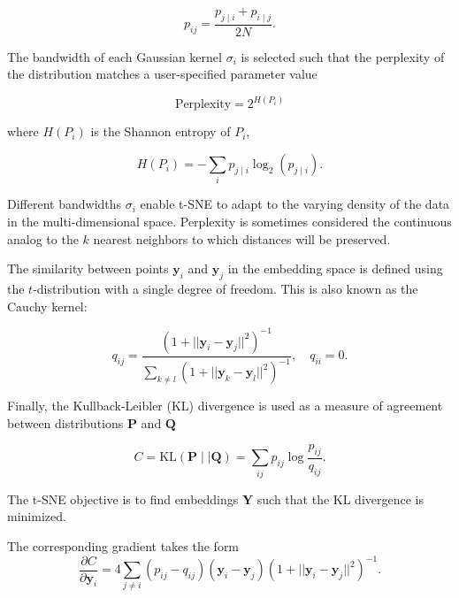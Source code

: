 \documentclass[twocolumn]{bmcart}
\begin{document}
\begin{equation}
p_{ij} = \frac{p_{j \mid i} + p_{i \mid j}}{2N}.
\label{eq:symmetrize}
\end{equation}

The bandwidth of each Gaussian kernel $\sigma_i$ is selected such that the
perplexity of the distribution matches a user-specified parameter value

\begin{equation}
\text{Perplexity} = 2^{H(P_i)}
\end{equation}

\noindent where $H(P_i)$ is the Shannon entropy of $P_i$,

\begin{equation}
H(P_i) = -\sum_i p_{j \mid i} \log_2 (p_{j \mid i}).
\end{equation}

\noindent Different bandwidths $\sigma_i$ enable t-SNE to adapt to the varying
density of the data in the multi-dimensional space. Perplexity is sometimes considered the continuous analog to the $k$ nearest neighbors to which distances will be preserved. 

The similarity between points $\mathbf{y}_i$ and $\mathbf{y}_j$ in the
embedding space is defined using the $t$-distribution with a single degree of
freedom. This is also known as the Cauchy kernel:

\begin{equation}
q_{ij} = \frac{\left ( 1 + || \mathbf{y}_i - \mathbf{y}_j ||^2 \right )^{-1}}
{\sum_{k \neq l}\left ( 1 + || \mathbf{y}_k - \mathbf{y}_l ||^2 \right )^{-1}},
\quad q_{ii} = 0.
\label{eq:cauchy_kernel}
\end{equation}

Finally, the Kullback-Leibler (KL) divergence is used as a measure of agreement between distributions $\mathbf{P}$ and $\mathbf{Q}$

\begin{equation}
C = \text{KL}(\mathbf{P} \mid \mid \mathbf{Q}) = \sum_{ij} p_{ij} \log \frac{p_{ij}}{q_{ij}}.
\label{eq:kl_divergence}
\end{equation}

\noindent The t-SNE objective is to find embeddings $\mathbf{Y}$ such that the KL divergence is minimized.

The corresponding gradient takes the form
\begin{equation}
\frac{\partial C}{\partial \mathbf{y}_i} = 4 \sum_{j \neq i} \left ( p_{ij} - q_{ij} \right ) \left ( \mathbf{y}_i - \mathbf{y}_j \right ) \left ( 1 + || \mathbf{y}_i - \mathbf{y}_j || ^2 \right )^{-1}.
\label{eq:tsne_gradient}
\end{equation}
\end{document}

